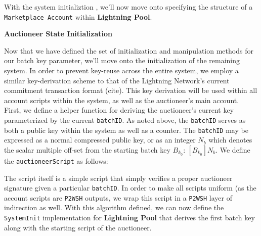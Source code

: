 \documentclass[10pt,a4paper]{article}
\theoremstyle{definition}
\begin{document}
With the system initializtion , we'll now move onto specifying the structure of
a \texttt{Marketplace Account} within \textbf{Lightning Pool}.

\begin{center}
    \textbf{Auctioneer State Initialization}
\end{center}

Now that we have defined the set of initialization and manipulation methods for
our batch key parameter, we'll move onto the initialization of the remaining
system. In order to prevent key-reuse across the entire system, we employ a
similar key-derivation scheme to that of the Lightning Network's current
commitment transaction format (cite). This key derivation will be used within
all account scripts within the system, as well as the auctioneer's main
account. \\

First, we define a helper function for deriving the auctioneer's current key
parameterized by the current \texttt{batchID}. As noted above, the
\texttt{batchID} serves as both a public key within the system as well as a
counter. The \texttt{batchID} may be expressed as a normal compressed public
key, or as an integer $N_{b}$ which denotes the scalar multiple off-set from
the starting batch key $B_{k_0}$: $[B_{k_0}]N_{b}$. We define the
\texttt{auctioneerScript} as follows: 

\begin{pcvstack}[boxed,center, space=1em]
\end{pcvstack} 

The script itself is a simple script that simply verifies a proper auctioneer
signature given a particular \texttt{batchID}. In order to make all scripts
uniform (as the account scripts are \texttt{P2WSH} outputs, we wrap this script
in a \texttt{P2WSH} layer of indirection as well. With this algorithm defined,
we can now define the \texttt{SystemInit} implementation for \textbf{Lightning
Pool} that derives the first batch key along with the starting script of the
auctioneer. \\

\begin{pcvstack}[boxed,center, space=1em]
\end{pcvstack} 
\end{document}
